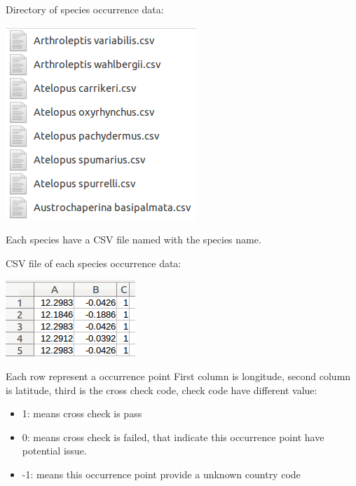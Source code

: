 \documentclass{beamer}
\begin{document}
\begin{frame}
	Directory of species occurrence data:
	\begin{center}
		\includegraphics[scale=0.4]{image/data_dir.png}
	\end{center}
	Each species have a CSV file named with the species name.
\end{frame}
\begin{frame}
	CSV file of each species occurrence data:
	\begin{center}
		\includegraphics[scale=0.4]{image/csv_structure.png}
	\end{center}
	Each row represent a occurrence point
	\newline First column is longitude, second column is latitude, third is the cross check code, check code have different value:
	\begin{itemize}
		\item 1: means cross check is pass
		\item 0: means cross check is failed, that indicate this occurrence point have potential issue.
		\item -1: means this occurrence point provide a unknown country code
	\end{itemize}
\end{frame}
\end{document}
